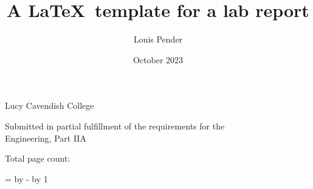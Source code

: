 \documentclass[12pt,a4paper,twoside]{report}
\title{A \LaTeX\ template for a lab report}
\author{Louis Pender}
\date{October 2023}
\newif\ifsubmission %
\newcommand{\candidatenumber}{1234N}
\newcommand{\college}{Lucy Cavendish College}
\newcommand{\course}{Engineering, Part IIA}
\begin{document}
\begin{sffamily} %

\begin{titlepage}
\makeatletter


\ifsubmission

\begin{Large}
\vspace{20mm}
Lab report title page

\vspace{35mm}
Candidate \candidatenumber

\vspace{42mm}
\textsl{``\@title''}

\end{Large}

\else

\begin{center}
\Huge
\vspace{\fill}

\@title
\vspace{\fill}

\@author
\vspace{10mm}

\Large
\college
\vspace{\fill}

\@date
\vspace{\fill}

\end{center}

\fi

\vspace{\fill}
\begin{center}
Submitted in partial fulfillment of the requirements for the\\
\course
\end{center}

\makeatother
\end{titlepage}

\newpage

Total page count: \pageref{lastpage}

\makeatletter
\@tempcnta=\relax%
\advance\@tempcnta by -%
\advance\@tempcnta by 1%
\xdef\contentpages{\the\@tempcnta}%
\makeatother


\end{sffamily}
\end{document}
